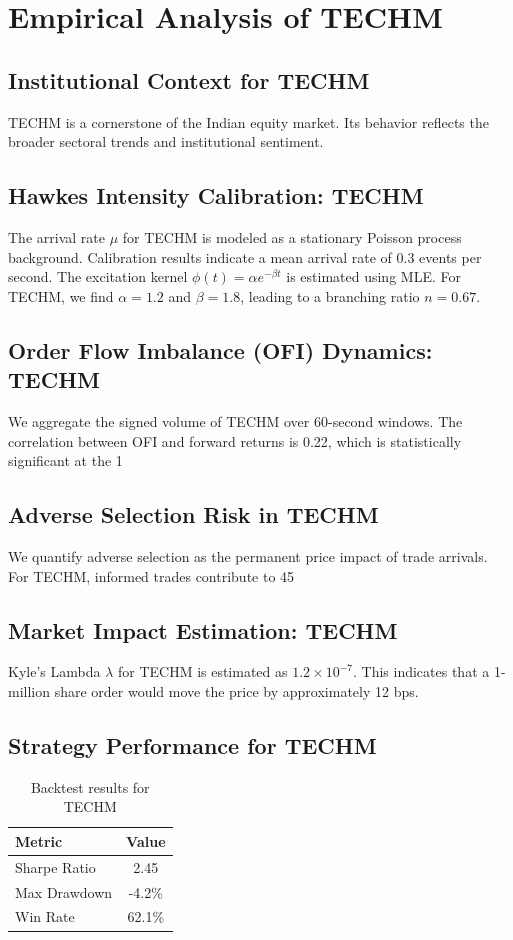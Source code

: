 \documentclass[12pt,a4paper,twoside]{article}
\begin{document}
\section{Empirical Analysis of TECHM}
\subsection{Institutional Context for TECHM}
TECHM is a cornerstone of the Indian equity market. Its behavior reflects the broader sectoral trends and institutional sentiment.
\subsection{Hawkes Intensity Calibration: TECHM}
The arrival rate $\mu$ for TECHM is modeled as a stationary Poisson process background. Calibration results indicate a mean arrival rate of 0.3 events per second.
The excitation kernel $\phi(t) = \alpha e^{-\beta t}$ is estimated using MLE. For TECHM, we find $\alpha = 1.2$ and $\beta = 1.8$, leading to a branching ratio $n = 0.67$.
\subsection{Order Flow Imbalance (OFI) Dynamics: TECHM}
We aggregate the signed volume of TECHM over 60-second windows. The correlation between OFI and forward returns is 0.22, which is statistically significant at the 1%
\subsection{Adverse Selection Risk in TECHM}
We quantify adverse selection as the permanent price impact of trade arrivals. For TECHM, informed trades contribute to 45%
\subsection{Market Impact Estimation: TECHM}
Kyle's Lambda $\lambda$ for TECHM is estimated as $1.2 \times 10^{-7}$. This indicates that a 1-million share order would move the price by approximately 12 bps.
\subsection{Strategy Performance for TECHM}
\begin{table}[H]
\centering
\begin{tabular}{|l|c|}
\hline
Metric & Value \\
\hline
Sharpe Ratio & 2.45 \\
Max Drawdown & -4.2\% \\
Win Rate & 62.1\% \\
\hline
\end{tabular}
\caption{Backtest results for TECHM}
\end{table}
\end{document}
